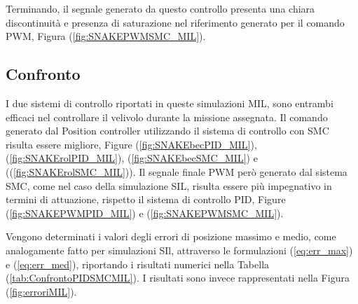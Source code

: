 Terminando, il segnale generato da questo controllo presenta una chiara discontinuità e presenza di saturazione nel riferimento generato per il comando PWM, Figura (\ref{fig:SNAKEPWMSMC_MIL}).

\subsection{Confronto}

I due sistemi di controllo riportati in queste simulazioni MIL, sono entrambi efficaci nel controllare il velivolo durante la missione assegnata. Il comando generato dal Position controller utilizzando il sistema di controllo con SMC risulta essere migliore, Figure (\ref{fig:SNAKEbecPID_MIL}), (\ref{fig:SNAKErolPID_MIL}), (\ref{fig:SNAKEbecSMC_MIL}) e ((\ref{fig:SNAKErolSMC_MIL})). Il segnale finale PWM però generato dal sistema SMC, come nel caso della simulazione SIL, risulta essere più impegnativo in termini di attuazione, rispetto il sistema di controllo PID, Figure (\ref{fig:SNAKEPWMPID_MIL}) e (\ref{fig:SNAKEPWMSMC_MIL}).

Vengono determinati i valori degli errori di posizione massimo e medio, come analogamente fatto per simulazioni SIl, attraverso le formulazioni (\ref{eq:err_max}) e (\ref{eq:err_med}), riportando i risultati numerici nella Tabella (\ref{tab:ConfrontoPIDSMCMIL}). I risultati sono invece rappresentati nella Figura (\ref{fig:erroriMIL}).

